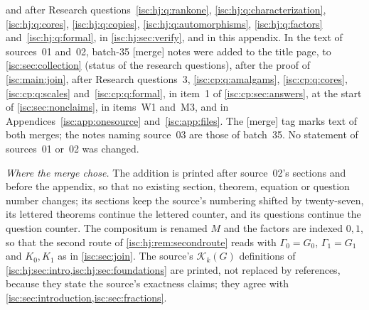 \documentclass[11pt,letterpaper]{article}
\theoremstyle{definition}
\theoremstyle{remark}
\newcommand{\K}[2]{\mathcal K_{#1}(#2)}
\newcommand{\mtag}{\textup{[merge]}}%
\numberwithin{equation}{section}
\begin{document}
\begin{enumerate}[label=(\arabic*)]
and after Research
questions~\ref{isc:hj:q:rankone}, \ref{isc:hj:q:characterization},
\ref{isc:hj:q:cores}, \ref{isc:hj:q:copies}, \ref{isc:hj:q:automorphisms},
\ref{isc:hj:q:factors} and~\ref{isc:hj:q:formal}, in
\cref{isc:hj:sec:verify}, and in this appendix. In the text of sources~01
and~02, batch-35 \mtag{} notes were added to the title page, to
\cref{isc:sec:collection} (status of the research questions), after the
proof of \cref{isc:main:join}, after Research questions~3,
\ref{isc:cp:q:amalgams}, \ref{isc:cp:q:cores}, \ref{isc:cp:q:scales}
and~\ref{isc:cp:q:formal}, in item~1 of \cref{isc:cp:sec:answers}, at the
start of \cref{isc:sec:nonclaims}, in items~W1 and~M3, and in
Appendices~\ref{isc:app:onesource} and~\ref{isc:app:files}. The
\mtag{} tag marks text of both merges; the notes naming source~03 are
those of batch~35. No statement of sources~01 or~02 was changed.
\end{enumerate}

\emph{Where the merge chose.} The addition is printed after source~02's
sections and before the appendix, so that no existing section, theorem,
equation or question number changes; its sections keep the source's
numbering shifted by twenty-seven, its lettered theorems continue the
lettered counter, and its questions continue the question counter. The
compositum is renamed $M$ and the factors are indexed $0,1$, so that the
second route of \cref{isc:hj:rem:secondroute} reads with $\Gamma_0=G_0$,
$\Gamma_1=G_1$ and $K_0,K_1$ as in \cref{isc:sec:join}. The source's
$\K{k}{G}$ definitions of \cref{isc:hj:sec:intro,isc:hj:sec:foundations}
are printed, not replaced by references, because they state the source's
exactness claims; they agree with \cref{isc:sec:introduction,isc:sec:fractions}.
\end{document}

